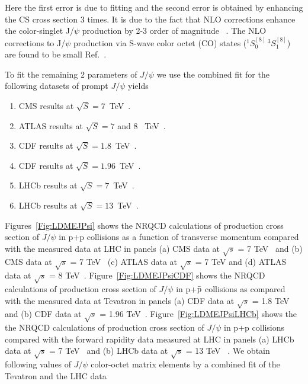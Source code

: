 \documentclass[12pt,a4paper,final]{iopart}
\newcommand{\barc}{{\bar{c}}}
\newcommand{\charm}{{\rm{charm}}}
\begin{document}
Here the first error is due to fitting and the second error is 
obtained by enhancing the CS cross section 3 times. 
  It is due to the fact that NLO corrections enhance the color-singlet J/$\psi$ production 
by 2-3 order of magnitude ~\cite{Gong:2008sn}.
 The NLO corrections to J/$\psi$ production via S-wave color octet (CO) states 
($^1S_{0}^{[8]}\,^3S_{1}^{[8]}$) are found to be small Ref.~\cite{Gong:2008ft}.

  To fit the remaining 2 parameters of $J/\psi$ we use the combined fit for the
following datasets of prompt $J/\psi$ yields
\begin{enumerate}
\item{CMS results at $\sqrt{S}=7$~TeV~\cite{Chatrchyan:2011kc,Khachatryan:2015rra}}.
\item{ATLAS results at $\sqrt{S}=7$ and 8 ~TeV~\cite{Aad:2015duc}}.
\item{CDF results at $\sqrt{S}=1.8$~TeV~\cite{Abe:1997jz}}.
\item{CDF results at $\sqrt{S}=1.96$~TeV~\cite{Acosta:2004yw}}.
\item{LHCb results at $\sqrt{S}=7$~TeV~\cite{Aaij:2011jh}}.
\item{LHCb results at $\sqrt{S}=13$~TeV~\cite{Aaij:2015rla}}.
\end{enumerate}

 Figures~\ref{Fig:LDMEJPsi} shows the NRQCD calculations of production cross section of 
$J/\psi$ in p+p collisions as a function of transverse momentum compared with 
the measured data at LHC in panels (a) CMS data at $\sqrt{s}$ = 7 TeV~\cite{Chatrchyan:2011kc} 
and (b) CMS data at $\sqrt{s}$ = 7 TeV~\cite{Khachatryan:2015rra} (c) ATLAS data at $\sqrt{s}$ = 7 TeV 
and (d) ATLAS data at $\sqrt{s}$ = 8 TeV~\cite{Aad:2015duc}. 
   Figure~\ref{Fig:LDMEJPsiCDF} shows  the NRQCD calculations of production cross 
section of $J/\psi$ in p+{$\bar {\rm p}$}  collisions as compared with the measured data at 
Tevatron in panels 
(a) CDF data at $\sqrt{s}$ = 1.8 TeV~\cite{Abe:1997jz} and 
(b) CDF data at $\sqrt{s}$ = 1.96 TeV~\cite{Acosta:2004yw}. 
  Figure~\ref{Fig:LDMEJPsiLHCb} shows the the NRQCD calculations of production cross 
section of $J/\psi$ in p+p collisions compared with the forward rapidity data measured at LHC in panels
(a) LHCb data at $\sqrt{s}$ = 7 TeV~\cite{Aaij:2011jh} and (b) LHCb data at $\sqrt{s}$ = 13 TeV 
~\cite{Aaij:2015rla}. 
 We obtain following values of $J/\psi$ color-octet matrix elements by a combined fit of 
the Tevatron and the LHC data
\end{document}
